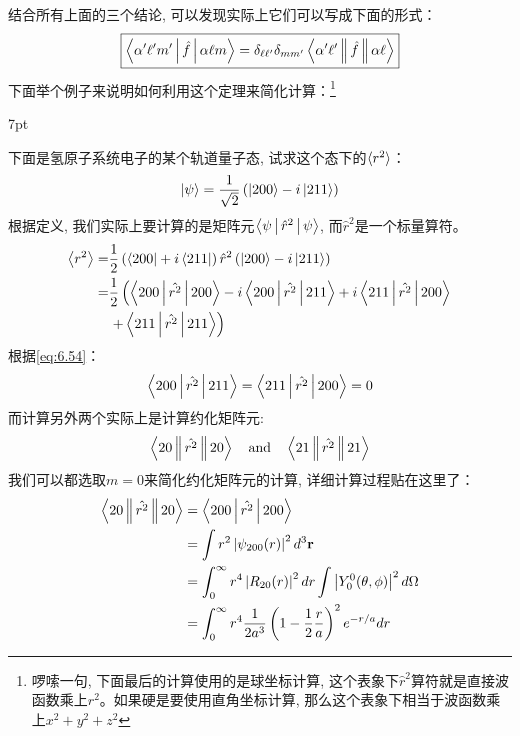 \documentclass[a4paper,zihao=-4,linespread=1]{ctexrep}
\newenvironment{lequation}{\large\begin{equation}}{\end{equation}}
\newenvironment{thinknote}{%
\def\FrameCommand{%
\hspace{1pt}%
{\color{BurlyWood}\vrule width 2pt}%
{\color{formalshade}\vrule width 4pt}%
\colorbox{formalshade}%
}%
\MakeFramed{\advance\hsize-\width\FrameRestore}%
\noindent\hspace{-4.55pt}%
\begin{adjustwidth}{}{7pt}%
\vspace{2pt}\vspace{2pt}%
}
{%
\vspace{2pt}\end{adjustwidth}\endMakeFramed%
}
\begin{document}
    结合所有上面的三个结论, 可以发现实际上它们可以写成下面的形式：
    \begin{lequation}
        \label{eq:6.54}
        \boxed{\Braket{\alpha^\prime\ell^\prime m^\prime|\hat{f}|\alpha \ell m}=\delta_{\ell\ell^\prime}\delta_{mm^\prime}\Braket{\alpha^\prime \ell^\prime \|\hat{f}\|\alpha\ell }}
    \end{lequation}
    下面举个例子来说明如何利用这个定理来简化计算：\footnote{啰嗦一句, 下面最后的计算使用的是球坐标计算, 这个表象下$\hat{r}^2$算符就是直接波函数乘上$r^2$。如果硬是要使用直角坐标计算, 那么这个表象下相当于波函数乘上$x^2+y^2+z^2$}
    \begin{thinknote}
        下面是氢原子系统电子的某个轨道量子态, 试求这个态下的$\braket{r^2}$：
        \begin{equation}
            \ket{\psi}=\frac{1}{\sqrt{2}}\left(\ket{200}-i\ket{211}\right)
        \end{equation}
        根据定义, 我们实际上要计算的是矩阵元$\Braket{\psi|\hat{r}^2|\psi}$, 而$\hat{r}^2$是一个标量算符。
        \begin{align*}
            \Braket{r^2}=&\frac{1}{2}\left(\bra{200}+i\bra{211}\right)\hat{r}^2\left(\ket{200}-i\ket{211}\right)\\
            =&\frac{1}{2}\left(\Braket{200|\hat{r^2}|200}-i\Braket{200|\hat{r^2}|211}+i\Braket{211|\hat{r^2}|200}\right.\\
            &\left.+\Braket{211|\hat{r^2}|211}\right)
        \end{align*}
        根据\ref{eq:6.54}：
        \begin{equation}
            \Braket{200|\hat{r^2}|211}=\Braket{211|\hat{r^2}|200}=0
        \end{equation}
        而计算另外两个实际上是计算约化矩阵元:
        \[\Braket{20\|\hat{r^2}\|20}\quad \text{and}\quad \Braket{21\|\hat{r^2}\|21}\]
        我们可以都选取$m=0$来简化约化矩阵元的计算, 详细计算过程贴在这里了：
        \begin{align*}
            \Braket{20\|\hat{r^2}\|20}&=\Braket{200|\hat{r^2}|200}\\
            &=\int r^{2}\left|\psi_{200}(r)\right|^{2} d^{3} \mathbf{r} \\
            &=\int_{0}^{\infty} r^{4}\left|R_{20}(r)\right|^{2} d r \int\left|Y_{0}^{0}(\theta, \phi)\right|^{2} d \Omega \\
            &=\int_{0}^{\infty} r^{4} \frac{1}{2 a^{3}}\left(1-\frac{1}{2} \frac{r}{a}\right)^{2} e^{-r / a} d r \\

\end{align*}
\end{thinknote}
\end{document}
